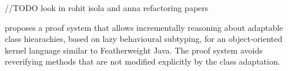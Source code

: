 //TODO look in rohit isola and anna refactoring papers

\cite{dovland:adaptableclass2015} proposes a proof system that allows
incrementally reasoning about adaptable class hiearachies, based on
lazy behavioural subtyping, for 
an object-oriented kernel language similar to Featherweight Java.  The
proof system avoids reverifying methods that are not modified
explicitly by the class adaptation.



